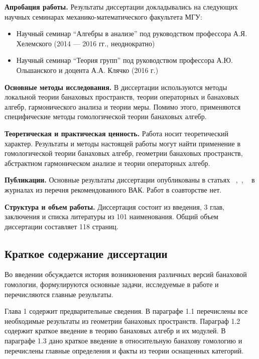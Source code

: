 \textbf{Апробация работы.} Результаты диссертации докладывались на следующих
научных семинарах механико-математического факультета МГУ:

\begin{itemize}
    \item Научный семинар ``Алгебры в анализе'' под руководством профессора А.Я.
          Хелемского  (2014 — 2016 гг., неоднократно)
    \item Научный семинар ``Теория групп'' под руководством профессора А.Ю.
          Ольшанского и доцента А.А. Клячко (2016 г.)
\end{itemize}

\textbf{Основные методы исследования.} В диссертации используются методы
локальной теории банаховых пространств, теории операторных и банаховых алгебр,
гармонического анализа и теории меры. Помимо этого, применяются специфические
методы гомологической теории банаховых алгебр.

\textbf{Теоретическая и практическая ценность.} Работа носит теоретический
характер. Результаты и методы настоящей работы могут найти применение в
гомологической теории банаховых алгебр, геометрии банаховых пространств,
абстрактном гармоническом анализе и теории операторных алгебр.

\textbf{Публикации.} Основные результаты диссертации опубликованы в статьях
~\cite{NemMetTopProjIdBanAlg},~\cite{NemTopInjCStarAlg},
~\cite{NemHomolTrivCatModLp} в журналах из перечня рекомендованного ВАК. Работ в
соавторстве нет.

\textbf{Структура и объем работы.} Диссертация состоит из введения, 3 глав,
заключения и списка литературы из 101 наименования. Общий объем диссертации
составляет 118 страниц.

\subsection*{\Large Краткое содержание диссертации}
Во введении обсуждается история возникновения различных версий банаховой
гомологии, формулируются основные задачи, исследуемые в работе и перечисляются
главные результаты.

Глава 1 содержит предварительные сведения. В параграфе 1.1 перечислены все
необходимые результаты из геометрии банаховых пространств. Параграф 1.2 содержит
краткое введение в теорию банаховых алгебр и их модулей. В параграфе 1.3 дано
краткое введение в относительную банахову гомологию и перечислены главные
определения и факты из теории оснащенных категорий.

